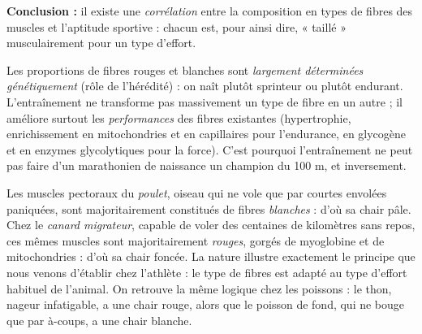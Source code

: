 \documentclass[11pt]{article}
\newcommand{\cle}[1]{{\popxbold\color{popdark}#1}}
\begin{document}
\textbf{Conclusion :} il existe une \emph{corrélation} entre la composition en types de fibres des muscles et l'aptitude sportive : chacun est, pour ainsi dire, « taillé » musculairement pour un type d'effort.

\begin{aretenir}
Les proportions de fibres rouges et blanches sont \emph{largement déterminées génétiquement} (rôle de l'\cle{hérédité}) : on naît plutôt sprinteur ou plutôt endurant. L'\cle{entraînement} ne transforme pas massivement un type de fibre en un autre ; il améliore surtout les \emph{performances} des fibres existantes (hypertrophie, enrichissement en mitochondries et en capillaires pour l'endurance, en glycogène et en enzymes glycolytiques pour la force). C'est pourquoi l'entraînement ne peut pas faire d'un marathonien de naissance un champion du 100 m, et inversement.
\end{aretenir}

\begin{savaistu}
Les muscles pectoraux du \emph{poulet}, oiseau qui ne vole que par courtes envolées paniquées, sont majoritairement constitués de fibres \emph{blanches} : d'où sa chair pâle. Chez le \emph{canard migrateur}, capable de voler des centaines de kilomètres sans repos, ces mêmes muscles sont majoritairement \emph{rouges}, gorgés de myoglobine et de mitochondries : d'où sa chair foncée. La nature illustre exactement le principe que nous venons d'établir chez l'athlète : le type de fibres est adapté au type d'effort habituel de l'animal. On retrouve la même logique chez les poissons : le thon, nageur infatigable, a une chair rouge, alors que le poisson de fond, qui ne bouge que par à-coups, a une chair blanche.
\end{savaistu}
\end{document}
